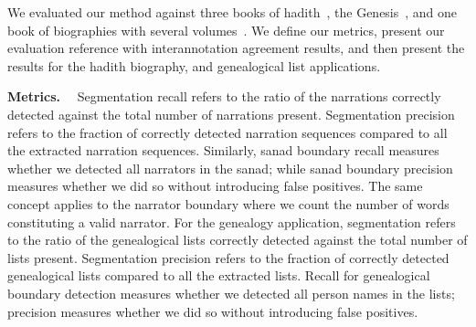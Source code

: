 \documentclass{llncs}
\begin{document}

%

We evaluated our method against three books of 
hadith~\cite{IbnHanbal,AlTousi,AlKulayni},
the Genesis~\cite{},
and one book of biographies with several volumes~\cite{khoei}. 
We define our metrics, present our evaluation reference with interannotation agreement results, 
and then present the results for the hadith
biography, and genealogical list applications.

{\bf Metrics.}~~
Segmentation recall refers to the ratio of the narrations correctly detected against the
total number of narrations present. 
Segmentation precision refers to the fraction of correctly detected narration sequences compared to all the extracted
narration sequences. 
Similarly, sanad boundary recall measures whether we detected all narrators
in the sanad; while sanad boundary precision measures whether we did so without introducing false positives. 
The same concept applies to the narrator boundary where we count the number of words constituting 
a valid narrator.
For the genealogy application, segmentation refers to the ratio of the genealogical lists correctly detected against the total 
number of lists present.
Segmentation precision refers to the fraction of correctly detected genealogical lists compared to all the extracted lists. 
Recall for genealogical boundary detection measures whether we detected all person names in the lists; 
precision measures whether we did so without introducing false positives.
\end{document}
